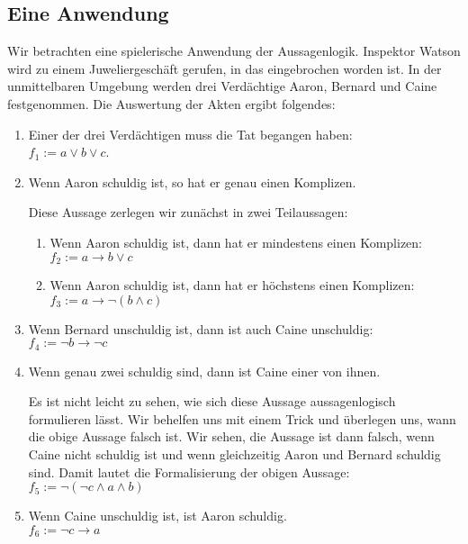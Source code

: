 \subsection{Eine Anwendung}
Wir betrachten eine spielerische Anwendung der Aussagenlogik.  Inspektor Watson wird zu
einem Juweliergeschäft gerufen, in das eingebrochen worden ist.
In der unmittelbaren Umgebung werden drei Verdächtige Aaron, Bernard und Caine festgenommen.
Die Auswertung der Akten ergibt folgendes:
\begin{enumerate}
\item Einer der drei Verdächtigen muss die Tat begangen haben: \\[0.2cm]
      \hspace*{1.3cm} 
      $f_1 := a \vee b \vee c$.
\item Wenn Aaron schuldig ist, so hat er genau einen Komplizen. 

      Diese Aussage zerlegen wir zunächst in zwei Teilaussagen:
      \begin{enumerate}
      \item Wenn Aaron schuldig ist, dann hat er mindestens einen Komplizen: \\[0.2cm]
            \hspace*{1.3cm} $f_2 := a \rightarrow b \vee c$ 
      \item Wenn Aaron schuldig ist, dann hat er höchstens einen Komplizen: \\[0.2cm]
           \hspace*{1.3cm} $f_3 := a \rightarrow \neg (b \wedge c)$
      \end{enumerate}
\item Wenn Bernard unschuldig ist, dann ist auch Caine unschuldig: \\[0.2cm]
      \hspace*{1.3cm} $f_4 :=  \neg b \rightarrow \neg c$ 
\item Wenn genau zwei schuldig sind, dann ist Caine einer von ihnen.

      Es ist nicht leicht zu sehen, wie sich diese Aussage aussagenlogisch
      formulieren lässt.  Wir behelfen uns mit einem Trick und überlegen uns, wann die
      obige Aussage falsch ist.  Wir sehen, die Aussage ist dann falsch,
      wenn Caine nicht schuldig ist und wenn gleichzeitig Aaron und Bernard schuldig sind.
      Damit lautet die Formalisierung der obigen Aussage: \\[0.2cm]
      \hspace*{1.3cm} $f_5 := \neg ( \neg c  \wedge a \wedge b )$ 
\item Wenn Caine unschuldig ist, ist Aaron schuldig. \\[0.2cm]
      \hspace*{1.3cm} $f_6 := \neg c \rightarrow a$
\end{enumerate}
